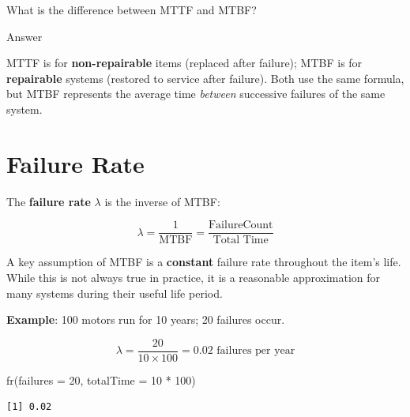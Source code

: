\documentclass[
  letterpaper,
  DIV=11,
  numbers=noendperiod]{scrreprt}
\newenvironment{Shaded}{\begin{snugshade}}{\end{snugshade}}
\newcommand{\AttributeTok}[1]{\textcolor[rgb]{0.40,0.45,0.13}{#1}}
\newcommand{\DecValTok}[1]{\textcolor[rgb]{0.68,0.00,0.00}{#1}}
\newcommand{\FunctionTok}[1]{\textcolor[rgb]{0.28,0.35,0.67}{#1}}
\newcommand{\NormalTok}[1]{\textcolor[rgb]{0.00,0.23,0.31}{#1}}
\newcommand{\SpecialCharTok}[1]{\textcolor[rgb]{0.37,0.37,0.37}{#1}}
\begin{document}
\begin{tcolorbox}[enhanced jigsaw, arc=.35mm, bottomrule=.15mm, bottomtitle=1mm, breakable, colback=white, colbacktitle=quarto-callout-tip-color!10!white, colframe=quarto-callout-tip-color-frame, coltitle=black, left=2mm, leftrule=.75mm, opacityback=0, opacitybacktitle=0.6, rightrule=.15mm, title=\textcolor{quarto-callout-tip-color}{\faLightbulb}\hspace{0.5em}{Review}, titlerule=0mm, toprule=.15mm, toptitle=1mm]

What is the difference between MTTF and MTBF?

Answer

MTTF is for \textbf{non-repairable} items (replaced after failure); MTBF
is for \textbf{repairable} systems (restored to service after failure).
Both use the same formula, but MTBF represents the average time
\emph{between} successive failures of the same system.

\end{tcolorbox}

\section{Failure Rate}\label{failure-rate}

The \textbf{failure rate} \(\lambda\) is the inverse of MTBF:

\[\lambda = \frac{1}{\text{MTBF}} = \frac{\text{FailureCount}}{\text{Total Time}}\]

A key assumption of MTBF is a \textbf{constant} failure rate throughout
the item's life. While this is not always true in practice, it is a
reasonable approximation for many systems during their useful life
period.

\textbf{Example}: 100 motors run for 10 years; 20 failures occur.

\[\lambda = \frac{20}{10 \times 100} = 0.02 \text{ failures per year}\]

\begin{Shaded}
\begin{Highlighting}[]
\FunctionTok{fr}\NormalTok{(}\AttributeTok{failures =} \DecValTok{20}\NormalTok{, }\AttributeTok{totalTime =} \DecValTok{10} \SpecialCharTok{*} \DecValTok{100}\NormalTok{)}
\end{Highlighting}
\end{Shaded}

\begin{verbatim}
[1] 0.02
\end{verbatim}
\end{document}
